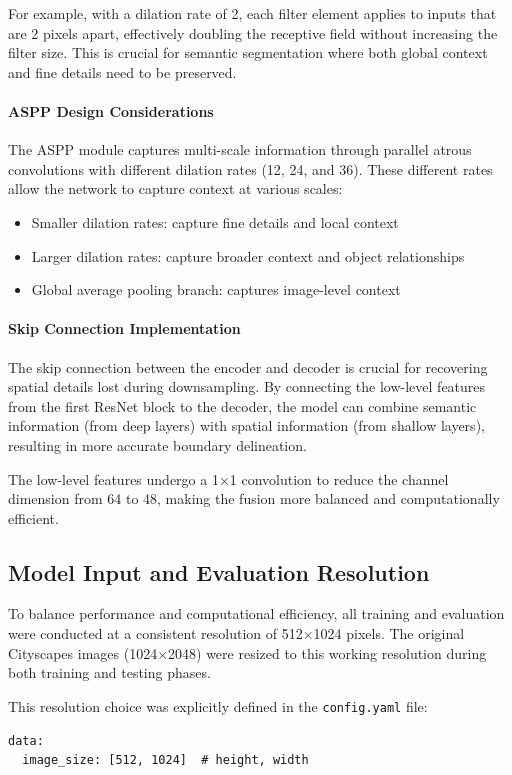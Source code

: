 \documentclass[]{article}
\begin{document}
For example, with a dilation rate of 2, each filter element applies to inputs that are 2 pixels apart, effectively doubling the receptive field without increasing the filter size. This is crucial for semantic segmentation where both global context and fine details need to be preserved.

\paragraph{ASPP Design Considerations}
The ASPP module captures multi-scale information through parallel atrous convolutions with different dilation rates (12, 24, and 36). These different rates allow the network to capture context at various scales:
\begin{itemize}
    \item Smaller dilation rates: capture fine details and local context
    \item Larger dilation rates: capture broader context and object relationships
    \item Global average pooling branch: captures image-level context
\end{itemize}

\paragraph{Skip Connection Implementation}
The skip connection between the encoder and decoder is crucial for recovering spatial details lost during downsampling. By connecting the low-level features from the first ResNet block to the decoder, the model can combine semantic information (from deep layers) with spatial information (from shallow layers), resulting in more accurate boundary delineation.

The low-level features undergo a 1×1 convolution to reduce the channel dimension from 64 to 48, making the fusion more balanced and computationally efficient.

\subsection{Model Input and Evaluation Resolution}
To balance performance and computational efficiency, all training and evaluation were conducted at a consistent resolution of 512×1024 pixels. The original Cityscapes images (1024×2048) were resized to this working resolution during both training and testing phases.

This resolution choice was explicitly defined in the \texttt{config.yaml} file:
\begin{verbatim}
data:
  image_size: [512, 1024]  # height, width
\end{verbatim}
\end{document}
